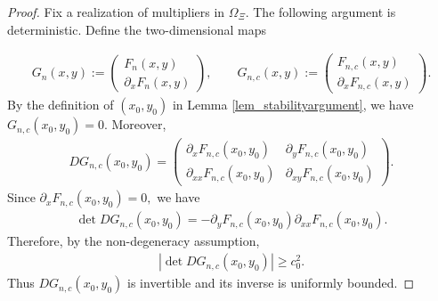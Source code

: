 \documentclass[10pt,a4paper]{amsart}
\begin{document}
\begin{proof}
	Fix a realization of multipliers in $\Omega_{\Xi}$. The following argument is deterministic.
	Define the two-dimensional maps
	
	\begin{align*}
		G_n(x,y):=
		\begin{pmatrix}
			F_n(x,y)\\
			\partial_xF_n(x,y)
		\end{pmatrix},
		\qquad
		G_{n,c}(x,y):=
		\begin{pmatrix}
			F_{n,c}(x,y)\\
			\partial_xF_{n,c}(x,y)
		\end{pmatrix}.
	\end{align*}
	By the definition of $(x_0,y_0)$ in Lemma \ref{lem_stabilityargument}, we have $G_{n,c}(x_0,y_0)=0.$ Moreover,
	\begin{align*}
		DG_{n,c}(x_0,y_0)
		=
		\begin{pmatrix}
			\partial_xF_{n,c}(x_0,y_0)
			&
			\partial_yF_{n,c}(x_0,y_0)\\
			\partial_{xx}F_{n,c}(x_0,y_0)
			&
			\partial_{xy}F_{n,c}(x_0,y_0)
		\end{pmatrix}.
	\end{align*}
	Since $\partial_xF_{n,c}(x_0,y_0)=0,$
	we have
	\begin{align*}
		\det DG_{n,c}(x_0,y_0)
		=
		-\partial_yF_{n,c}(x_0,y_0)
		\partial_{xx}F_{n,c}(x_0,y_0).
	\end{align*}
	Therefore, by the non-degeneracy assumption,
	\begin{align*}
		|\det DG_{n,c}(x_0,y_0)|\ge c_0^2.
	\end{align*}
	Thus $DG_{n,c}(x_0,y_0)$ is invertible and its inverse is uniformly bounded.
	

\end{proof}
\end{document}

